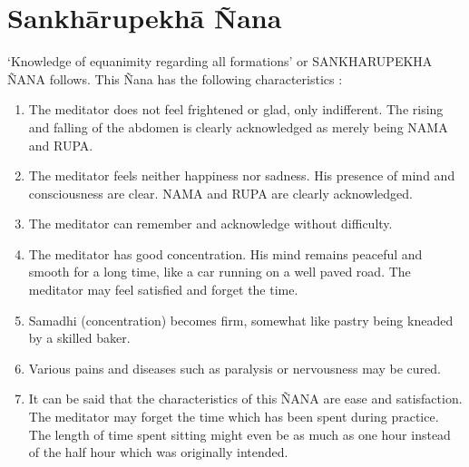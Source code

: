 \documentclass[a5paper,10pt,english]{book}
\begin{document}
\section{Sankhārupekhā Ñana}
\label{\detokenize{progress:sankharupekha-nana}}
\sphinxAtStartPar
‘Knowledge of equanimity regarding all formations’ or SANKHARUPEKHA ÑANA follows. This Ñana has the following characteristics :\sphinxhyphen{}
\begin{enumerate}
%
\item {} 
\sphinxAtStartPar
The meditator does not feel frightened or glad, only indifferent. The rising and falling of the abdomen is clearly acknowledged as merely being NAMA and RUPA.

\item {} 
\sphinxAtStartPar
The meditator feels neither happiness nor sadness. His presence of mind and consciousness are clear. NAMA and RUPA are clearly acknowledged.

\item {} 
\sphinxAtStartPar
The meditator can remember and acknowledge without difficulty.

\item {} 
\sphinxAtStartPar
The meditator has good concentration. His mind remains peaceful and smooth for a long time, like a car running on a well paved road. The meditator may feel satisfied and forget the time.

\item {} 
\sphinxAtStartPar
Samadhi (concentration) becomes firm, somewhat like pastry being kneaded by a skilled baker.

\item {} 
\sphinxAtStartPar
Various pains and diseases such as paralysis or nervousness may be cured.

\item {} 
\sphinxAtStartPar
It can be said that the characteristics of this ÑANA are ease and satisfaction. The meditator may forget the time which has been spent during practice. The length of time spent sitting might even be as much as one hour instead of the half hour which was originally intended.

\end{enumerate}
\end{document}
